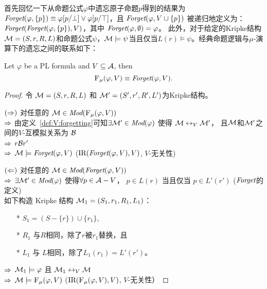 首先回忆一下从命题公式$\varphi$中遗忘原子命题$p$得到的结果为$\textit{Forget}(\varphi, \{p\})\equiv \varphi[p/\bot] \vee \varphi[p/\top]$，且 $\textit{Forget}(\varphi, V\cup \{p\})$ 被递归地定义为： $\textit{Forget}(\textit{Forget}(\varphi, \{p\}),V)$，其中 $\textit{Forget}(\varphi, \emptyset) = \varphi$。
此外，对于给定的Kripke结构${\cal M} = (S, r, R, L)$和命题公式$\psi$，${\cal M} \models  \psi$当且仅当$L(r) \models \psi$。经典命题逻辑与$\mu$-演算下的遗忘之间的联系如下：
\begin{theorem}\label{thm:PL:CTL}
	Let $\varphi$ be a PL formula and $V\subseteq {\cal A}$, then
	\[
	{\textsc{F}_{\textsc{$\mu$}}}(\varphi, V) \equiv \textit{Forget}(\varphi, V).
	\]
\end{theorem}
\begin{proof}
	令 ${\cal M} = (S, r, R, L)$ 和 ${\cal M}' = (S', r', R', L')$为Kripke结构。
	
	$(\Rightarrow)$ 对任意的 ${\cal M} \in \textit{Mod}({\textsc{F}_{\textsc{$\mu$}}}(\varphi, V))$ \\
	$\Rightarrow$ 由定义~\ref{def:V:forgetting}可知$\exists {\cal M}' \in \textit{Mod}(\varphi)$ 使得 ${\cal M} \leftrightarrow_V {\cal M}'$， %
	 且${\cal M}$和${\cal M}'$之间的$V$-互模拟关系为 ${\cal B}$\\
	$\Rightarrow$ $r {\cal B} r'$ \\
	$\Rightarrow$ ${\cal M} \models \textit{Forget}(\varphi, V)$ \hfill ($\textrm{IR}(\textit{Forget}(\varphi, V),V)$, $V$-无关性)
	
	$(\Leftarrow)$ 对任意的 ${\cal M} \in \textit{Mod}(\textit{Forget}(\varphi, V))$ \\
	$\Rightarrow$ $\exists {\cal M}' \in\textit{Mod}(\varphi)$ 使得$\forall p \in {\cal A}-V$， $p \in L(r)$ 当且仅当 $p \in L'(r')$ \hfill ($\textit{Forget}$的定义)\\
	
	如下构造 Kripke 结构 ${\cal M}_1 = (S_1, r_1, R_1, L_1)$：
	\begin{itemize}
		\item[*] $S_1 = (S - \{r\}) \cup \{r_1\}$,
		\item[*] $R_1$ 与$R$相同，除了$r$被$r_1$替换，且
		\item[*] $L_1$ 与 $L$相同，除了$L_1(r_1) = L'(r')$。
	\end{itemize}
	$\Rightarrow$ ${\cal M}_1 \models \varphi$ 且 ${\cal M}_1 \leftrightarrow_V {\cal M}$\\
	$\Rightarrow$ ${\cal M} \models {\textsc{F}_{\textsc{$\mu$}}}(\varphi, V)$ \hfill ($\textrm{IR}({\textsc{F}_{\textsc{$\mu$}}}(\varphi, V), V)$, $V$-无关性）
\end{proof}

